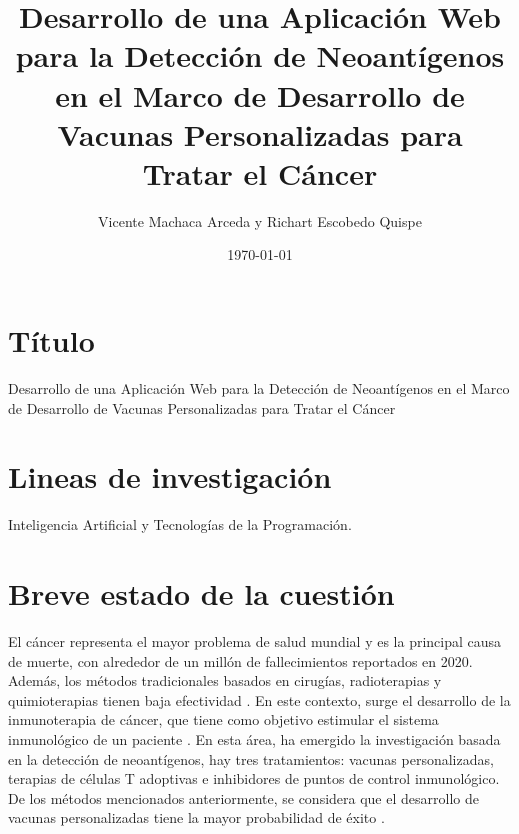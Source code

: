 \documentclass[a4paper]{article}
\title{Desarrollo de una Aplicación Web para la Detección de Neoantígenos en el Marco de Desarrollo de Vacunas Personalizadas para Tratar el Cáncer }
\author{Vicente Machaca Arceda y Richart  Escobedo Quispe}
\date{\today}
\begin{document}
	

	
	
	
	
	
	
	
	\maketitle

\section{Título}

Desarrollo de una Aplicación Web para la Detección de Neoantígenos en el Marco de Desarrollo de Vacunas Personalizadas para Tratar el Cáncer

\section{Lineas de investigación}
Inteligencia Artificial y Tecnologías de la Programación.

 
	\section{Breve estado de la cuestión}
	
	El cáncer representa el mayor problema de salud mundial y es la principal causa de muerte, con alrededor de un millón de fallecimientos reportados en 2020. Además, los métodos tradicionales basados en cirugías, radioterapias y quimioterapias tienen baja efectividad \citep{peng2019neoantigen}. En este contexto, surge el desarrollo de la inmunoterapia de cáncer, que tiene como objetivo estimular el sistema inmunológico de un paciente \citep{borden2022cancer}. En esta área, ha emergido la investigación basada en la detección de neoantígenos, hay tres tratamientos: vacunas personalizadas, terapias de células T adoptivas e inhibidores de puntos de control inmunológico. De los métodos mencionados anteriormente, se considera que el desarrollo de vacunas personalizadas  tiene la mayor probabilidad de éxito \citep{borden2022cancer}.\\
\end{document}
